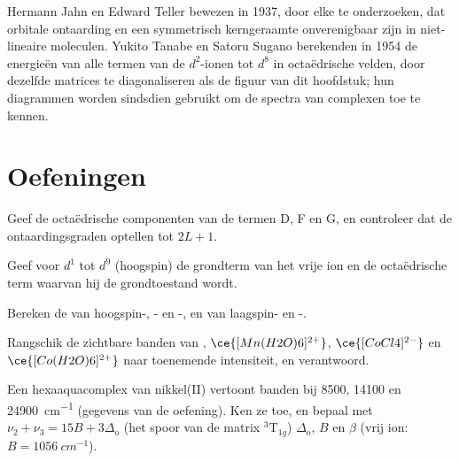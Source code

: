 \begin{history}
Hermann Jahn en Edward Teller bewezen in 1937, door elke  te
onderzoeken, dat orbitale ontaarding en een symmetrisch kerngeraamte
onverenigbaar zijn in niet-lineaire moleculen. Yukito Tanabe en Satoru
Sugano berekenden in 1954 de
energieën van alle termen van de $d^2$-ionen tot $d^8$ in octaëdrische velden, door
dezelfde matrices te diagonaliseren als de figuur van dit hoofdstuk;
hun diagrammen worden sindsdien gebruikt om de spectra van complexen toe
te kennen.
\end{history}

\section{Oefeningen}

\begin{exercise}[$\star$]\label{exo:b3:complex-spectra-magnetism:1}
Geef de octaëdrische componenten van de termen D, F en G, en controleer
dat de ontaardingsgraden optellen tot $2L + 1$.
\end{exercise}

\begin{exercise}[$\star$]\label{exo:b3:complex-spectra-magnetism:2}
Geef voor $d^1$ tot $d^9$ (hoogspin) de grondterm van het vrije ion en de octaëdrische term
waarvan hij de grondtoestand wordt.
\end{exercise}

\begin{exercise}[$\star$]\label{exo:b3:complex-spectra-magnetism:3}
Bereken de  van hoogspin-, - en -, en van laagspin-
en -.
\end{exercise}

\begin{exercise}[$\star$]\label{exo:b3:complex-spectra-magnetism:4}
Rangschik de zichtbare banden van , $\ce{[Mn(H2O)6]^{2+}}$, $\ce{[CoCl4]^{2-}}$ en
$\ce{[Co(H2O)6]^{2+}}$ naar toenemende intensiteit, en verantwoord.
\end{exercise}

\begin{exercise}[$\star\star$]\label{exo:b3:complex-spectra-magnetism:5}
Een hexaaquacomplex van nikkel(II) vertoont banden bij 8500, 14100 en \qty{24900}{cm^{-1}} (gegevens van
de oefening). Ken ze toe, en bepaal met $\nu_2 + \nu_3 = 15B + 3\Delta_{\mathrm o}$ (het spoor van de matrix $^3$T$_{1g}$)
$\Delta_{\mathrm o}$, $B$ en $\beta$ (vrij ion: $B = \qty{1056}{cm^{-1}}$).
\end{exercise}

